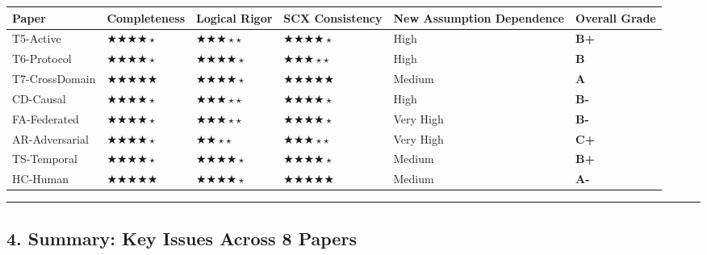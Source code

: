 \documentclass[
  12pt,
]{article}
\begin{document}
\begin{longtable}[]{@{}llllll@{}}
\toprule\noalign{}
Paper & Completeness & Logical Rigor & SCX Consistency & New Assumption Dependence & Overall Grade \\
\midrule\noalign{}
\endhead
\bottomrule\noalign{}
\endlastfoot
T5-Active & $\bigstar\bigstar\bigstar\bigstar{\scriptstyle\star}$ & $\bigstar\bigstar\bigstar{\scriptstyle\star}{\scriptstyle\star}$ & $\bigstar\bigstar\bigstar\bigstar{\scriptstyle\star}$ & High & \textbf{B+} \\
T6-Protocol & $\bigstar\bigstar\bigstar\bigstar{\scriptstyle\star}$ & $\bigstar\bigstar\bigstar\bigstar{\scriptstyle\star}$ & $\bigstar\bigstar\bigstar{\scriptstyle\star}{\scriptstyle\star}$ & High & \textbf{B} \\
T7-CrossDomain & $\bigstar\bigstar\bigstar\bigstar\bigstar$ & $\bigstar\bigstar\bigstar\bigstar{\scriptstyle\star}$ & $\bigstar\bigstar\bigstar\bigstar\bigstar$ & Medium & \textbf{A} \\
CD-Causal & $\bigstar\bigstar\bigstar\bigstar{\scriptstyle\star}$ & $\bigstar\bigstar\bigstar{\scriptstyle\star}{\scriptstyle\star}$ & $\bigstar\bigstar\bigstar\bigstar{\scriptstyle\star}$ & High & \textbf{B-} \\
FA-Federated & $\bigstar\bigstar\bigstar\bigstar{\scriptstyle\star}$ & $\bigstar\bigstar\bigstar{\scriptstyle\star}{\scriptstyle\star}$ & $\bigstar\bigstar\bigstar\bigstar{\scriptstyle\star}$ & Very High & \textbf{B-} \\
AR-Adversarial & $\bigstar\bigstar\bigstar\bigstar{\scriptstyle\star}$ & $\bigstar\bigstar{\scriptstyle\star}{\scriptstyle\star}$ & $\bigstar\bigstar\bigstar{\scriptstyle\star}{\scriptstyle\star}$ & Very High & \textbf{C+} \\
TS-Temporal & $\bigstar\bigstar\bigstar\bigstar{\scriptstyle\star}$ & $\bigstar\bigstar\bigstar\bigstar{\scriptstyle\star}$ & $\bigstar\bigstar\bigstar\bigstar{\scriptstyle\star}$ & Medium & \textbf{B+} \\
HC-Human & $\bigstar\bigstar\bigstar\bigstar\bigstar$ & $\bigstar\bigstar\bigstar\bigstar{\scriptstyle\star}$ & $\bigstar\bigstar\bigstar\bigstar\bigstar$ & Medium & \textbf{A-} \\
\end{longtable}

\begin{center}\rule{0.5\linewidth}{0.5pt}\end{center}

\subsection{4. Summary: Key Issues Across 8 Papers}\label{summary-key-issues-across-8-papers}
\end{document}
